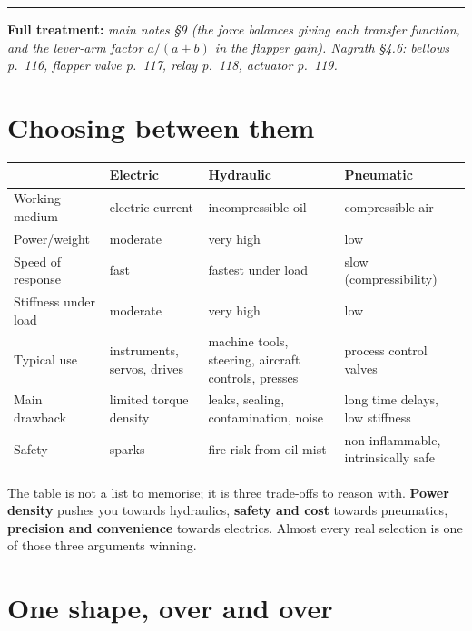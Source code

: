 \documentclass[11pt,a4paper]{article}
\newcommand{\fullmath}[1]{%
  \par\smallskip\noindent
  \textcolor{fnavy}{\rule{\textwidth}{0.4pt}}\par\vspace{-4pt}
  {\small\textcolor{fnavy}{\textbf{Full treatment:}} \textit{#1}}\par\smallskip}
\begin{document}
\fullmath{main notes \S9 (the force balances giving each transfer function, and the lever-arm factor $a/(a+b)$ in the flapper gain). Nagrath \S4.6: bellows p.~116, flapper valve p.~117, relay p.~118, actuator p.~119.}

\section{Choosing between them}

\begin{center}
\begin{tabular}{@{}p{}p{}p{}p{}@{}}
\toprule
 & \textbf{Electric} & \textbf{Hydraulic} & \textbf{Pneumatic}\\
\midrule
Working medium & electric current & incompressible oil & compressible air\\
Power/weight & moderate & very high & low\\
Speed of response & fast & fastest under load & slow (compressibility)\\
Stiffness under load & moderate & very high & low\\
Typical use & instruments, servos, drives & machine tools, steering, aircraft
controls, presses & process control valves\\
Main drawback & limited torque density & leaks, sealing, contamination, noise &
long time delays, low stiffness\\
Safety & sparks & fire risk from oil mist & non-inflammable, intrinsically
safe\\
\bottomrule
\end{tabular}
\end{center}

\begin{keyidea}
The table is not a list to memorise; it is three trade-offs to reason with.
\textbf{Power density} pushes you towards hydraulics, \textbf{safety and cost}
towards pneumatics, \textbf{precision and convenience} towards electrics. Almost
every real selection is one of those three arguments winning.
\end{keyidea}

\section{One shape, over and over}
\end{document}
